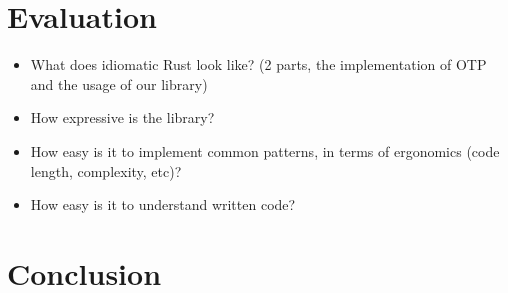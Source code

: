 \documentclass[a4paper]{article}
\begin{document}
\section{Evaluation}
\begin{itemize}
\item What does idiomatic Rust look like? (2 parts, the implementation of OTP
  and the usage of our library)
\item How expressive is the library?
\item How easy is it to implement common patterns, in terms of ergonomics (code
  length, complexity, etc)?
\item How easy is it to understand written code?
\end{itemize}

\section{Conclusion}
\end{document}
